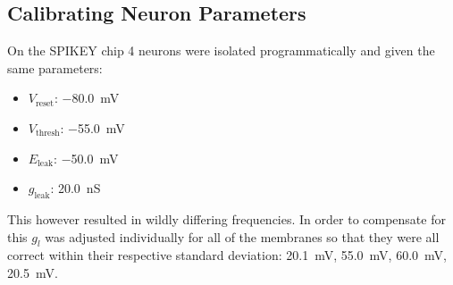 \documentclass[10pt,a4paper]{article}
\begin{document}
\subsection{Calibrating Neuron Parameters}
On the SPIKEY chip 4 neurons were isolated programmatically and given the same
parameters:
\begin{itemize}
    \item $V_\text{reset}$: \SI{-80.0}{\milli\volt}
    \item $V_\text{thresh}$: \SI{-55.0}{\milli\volt}
    \item $E_\text{leak}$: \SI{-50.0}{\milli\volt}
    \item $g_\text{leak}$:  \SI{20.0}{\nano\siemens}
\end{itemize}
This however resulted in wildly differing frequencies. In order to compensate
for this $g_l$ was adjusted individually for all of the membranes so that they
were all correct within their respective standard deviation:
\SI{20.1}{\milli\volt}, \SI{55.0}{\milli\volt}, \SI{60.0}{\milli\volt},
\SI{20.5}{\milli\volt}.
\end{document}
